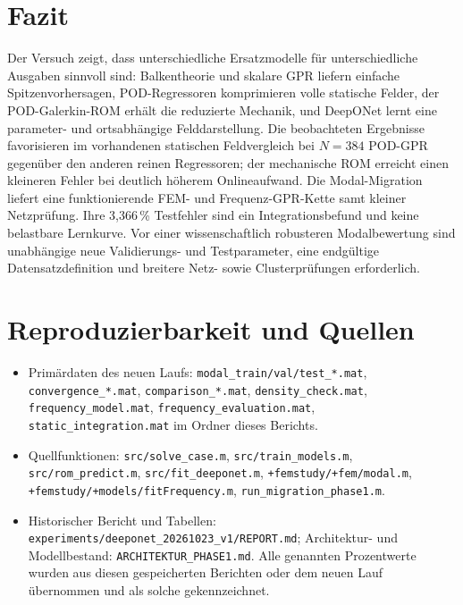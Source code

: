\documentclass[11pt,a4paper]{article}
\begin{document}
\section{Fazit}
Der Versuch zeigt, dass unterschiedliche Ersatzmodelle für unterschiedliche Ausgaben sinnvoll sind: Balkentheorie und skalare GPR liefern einfache Spitzenvorhersagen, POD-Regressoren komprimieren volle statische Felder, der POD-Galerkin-ROM erhält die reduzierte Mechanik, und DeepONet lernt eine parameter- und ortsabhängige Felddarstellung. Die beobachteten Ergebnisse favorisieren im vorhandenen statischen Feldvergleich bei $N=384$ POD-GPR gegenüber den anderen reinen Regressoren; der mechanische ROM erreicht einen kleineren Fehler bei deutlich höherem Onlineaufwand. Die Modal-Migration liefert eine funktionierende FEM- und Frequenz-GPR-Kette samt kleiner Netzprüfung. Ihre 3,366\,\% Testfehler sind ein Integrationsbefund und keine belastbare Lernkurve. Vor einer wissenschaftlich robusteren Modalbewertung sind unabhängige neue Validierungs- und Testparameter, eine endgültige Datensatzdefinition und breitere Netz- sowie Clusterprüfungen erforderlich.

\section*{Reproduzierbarkeit und Quellen}
\small\sloppy
\begin{itemize}
\item Primärdaten des neuen Laufs: \texttt{modal\_train/val/test\_*.mat}, \texttt{convergence\_*.mat}, \texttt{comparison\_*.mat}, \texttt{density\_check.mat}, \texttt{frequency\_model.mat}, \texttt{frequency\_evaluation.mat}, \texttt{static\_integration.mat} im Ordner dieses Berichts.
\item Quellfunktionen: \texttt{src/solve\_case.m}, \texttt{src/train\_models.m}, \texttt{src/rom\_predict.m}, \texttt{src/fit\_deeponet.m}, \texttt{+femstudy/+fem/modal.m}, \texttt{+femstudy/+models/fitFrequency.m}, \texttt{run\_migration\_phase1.m}.
\item Historischer Bericht und Tabellen: \texttt{experiments/deeponet\_20261023\_v1/REPORT.md}; Architektur- und Modellbestand: \texttt{ARCHITEKTUR\_PHASE1.md}. Alle genannten Prozentwerte wurden aus diesen gespeicherten Berichten oder dem neuen Lauf übernommen und als solche gekennzeichnet.
\end{itemize}
\end{document}
